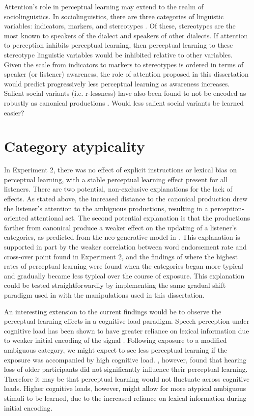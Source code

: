 Attention's role in perceptual learning may extend to the realm of sociolinguistics.  
In sociolinguistics, there are three categories of linguistic variables: indicators, markers, and stereotypes \citep{Labov1972}.
Of these, stereotypes are the most known to speakers of the dialect and speakers of other dialects.
If attention to perception inhibits perceptual learning, then perceptual learning to these stereotype linguistic variables would be inhibited relative to other variables.
Given the scale from indicators to markers to stereotypes is ordered in terms of speaker (or listener) awareness, the role of attention proposed in this dissertation would predict progressively less perceptual learning as awareness increases.
Salient social variants (i.e. r-lessness) have also been found to not be encoded as robustly as canonical productions \citep{Sumner2009}.
Would less salient social variants be learned easier?

\section{Category atypicality}

In Experiment 2, there was no effect of explicit instructions or lexical bias on perceptual learning, with a stable perceptual learning effect present for all listeners.
There are two potential, non-exclusive explanations for the lack of effects.
As stated above, the increased distance to the canonical production drew the listener's attention to the ambiguous productions, resulting in a perception-oriented attentional set.
The second potential explanation is that the productions farther from canonical produce a weaker effect on the updating of a listener's categories, as predicted from the neo-generative model in \citet{Pierrehumbert2002}.
This explanation is supported in part by the weaker correlation between word endorsement rate and cross-over point found in Experiment 2, and the findings of \citet{Sumner2011} where the highest rates of perceptual learning were found when the categories began more typical and gradually became less typical over the course of exposure.
This explanation could be tested straightforwardly by implementing the same gradual shift paradigm used in \citet{Sumner2011} with the manipulations used in this dissertation.

An interesting extension to the current findings would be to observe the perceptual learning effects in a cognitive load paradigm.  
Speech perception under cognitive load has been shown to have greater reliance on lexical information due to weaker initial encoding of the signal \citep{Mattys2011}.  
Following exposure to a modified ambiguous category, we might expect to see less perceptual learning if the exposure was accompanied by high cognitive load.  
\citet{Scharenborg2014}, however, found that hearing loss of older participants did not significantly influence their perceptual learning.  
Therefore it may be that perceptual learning would not fluctuate across cognitive loads.
Higher cognitive loads, however, might allow for more atypical ambiguous stimuli to be learned, due to the increased reliance on lexical information during initial encoding.

